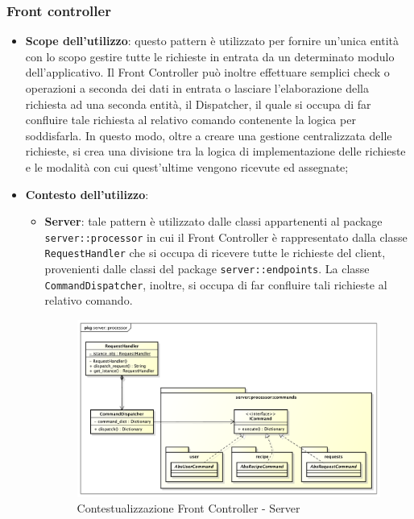 	\subsubsection{Front controller} %
	\label{ssub:front_controller}
		\begin{itemize}
			\item \textbf{Scope dell'utilizzo}: questo pattern è utilizzato per fornire un'unica entità con lo scopo gestire tutte le richieste in entrata da un determinato modulo dell'applicativo. Il Front Controller può inoltre effettuare semplici check o operazioni a seconda dei dati in entrata o lasciare l'elaborazione della richiesta ad una seconda entità, il Dispatcher, il quale si occupa di far confluire tale richiesta al relativo comando contenente la logica per soddisfarla. In questo modo, oltre a creare una gestione centralizzata delle richieste, si crea una divisione tra la logica di implementazione delle richieste e le modalità con cui quest'ultime vengono ricevute ed assegnate;
			\item \textbf{Contesto dell'utilizzo}:
				\begin{itemize}
					\item \textbf{Server}: tale pattern è utilizzato dalle classi appartenenti al package \texttt{server::processor} in cui il Front Controller è rappresentato dalla classe \texttt{RequestHandler} che si occupa di ricevere tutte le richieste del client, provenienti dalle classi del package	\texttt{server::endpoints}. La classe \newline \texttt{CommandDispatcher}, inoltre, si occupa di far confluire tali richieste al relativo comando. \newline
					\begin{figure}[!htbp]
						\centering
						\centerline{\includegraphics[scale=0.40]{./images/design_pattern_server/dp_front_controller.pdf}}
						\caption{Contestualizzazione Front Controller - Server}
					\end{figure}
				\end{itemize}
		\end{itemize}
